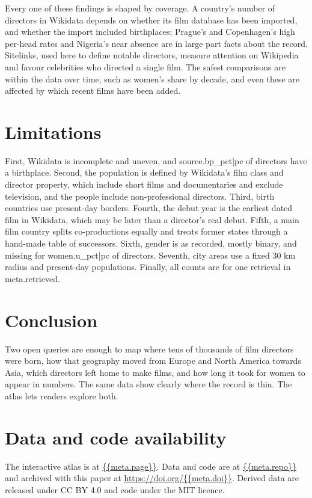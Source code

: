 \documentclass[11pt,a4paper]{article}
\begin{document}
Every one of these findings is shaped by coverage. A country's number of directors in Wikidata depends on whether its film database has been imported, and whether the import included birthplaces; Prague's and Copenhagen's high per-head rates and Nigeria's near absence are in large part facts about the record. Sitelinks, used here to define notable directors, measure attention on Wikipedia and favour celebrities who directed a single film. The safest comparisons are within the data over time, such as women's share by decade, and even these are affected by which recent films have been added.

\section{Limitations}
First, Wikidata is incomplete and uneven, and {{source.bp_pct|pc}} of directors have a birthplace. Second, the population is defined by Wikidata's film class and director property, which include short films and documentaries and exclude television, and the people include non-professional directors. Third, birth countries use present-day borders. Fourth, the debut year is the earliest dated film in Wikidata, which may be later than a director's real debut. Fifth, a main film country splits co-productions equally and treats former states through a hand-made table of successors. Sixth, gender is as recorded, mostly binary, and missing for {{women.u_pct|pc}} of directors. Seventh, city areas use a fixed 30 km radius and present-day populations. Finally, all counts are for one retrieval in {{meta.retrieved}}.

\section{Conclusion}
Two open queries are enough to map where tens of thousands of film directors were born, how that geography moved from Europe and North America towards Asia, which directors left home to make films, and how long it took for women to appear in numbers. The same data show clearly where the record is thin. The atlas lets readers explore both.

\section*{Data and code availability}
The interactive atlas is at \url{{{meta.page}}}. Data and code are at \url{{{meta.repo}}} and archived with this paper at \url{https://doi.org/{{meta.doi}}}. Derived data are released under CC BY 4.0 and code under the MIT licence.
\end{document}
